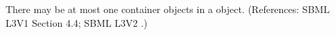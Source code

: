 There may be at most one \ListOfUnits container objects in a
\UnitDefinition object.  (References: SBML L3V1 Section 4.4; SBML L3V2
.)
